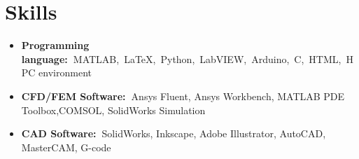 \documentclass[letterpaper,11pt]{article}
\begin{document}
      \ProjListII
      \ProjListIIEnd
      
      
      

      
\ProjListEnd



\newcommand{\SkillList}{\begin{itemize}[leftmargin=0.00in]}
\newcommand{\SkillListEnd}{\end{itemize}\vspace{-0pt}}

\newcommand{\SkillBullet}[2]
{\item[]\small{\textbf{#1}{#2 \vspace{-0pt}}}}

\section{Skills}
\SkillList    
    \SkillBullet{Programming language:~}  {MATLAB,~\LaTeX,~Python,~LabVIEW,~Arduino,~C,~HTML,~HPC environment~}
    
    \SkillBullet{CFD/FEM Software:~}{Ansys Fluent, Ansys Workbench, MATLAB PDE Toolbox,COMSOL, SolidWorks Simulation}
    
    \SkillBullet{CAD Software:~}{SolidWorks, Inkscape, Adobe Illustrator, AutoCAD, MasterCAM, G-code}

    
\SkillListEnd

\end{document}
